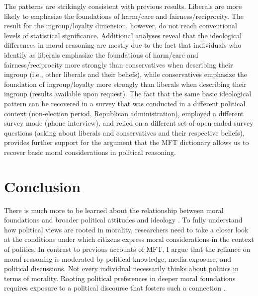 \documentclass[12pt]{article}
\begin{document}
The patterns are strikingly consistent with previous results. Liberals are more likely to emphasize the foundations of harm/care and fairness/reciprocity. The result for the ingroup/loyalty dimension, however, do not reach conventional levels of statistical significance. Additional analyses reveal that the ideological differences in moral reasoning are mostly due to the fact that individuals who identify as liberals emphasize the foundations of harm/care and fairness/reciprocity more strongly than conservatives when describing their ingroup (i.e., other liberals and their beliefs), while conservatives emphasize the foundation of ingroup/loyalty more strongly than liberals when describing their ingroup (results available upon request). The fact that the same basic ideological pattern can be recovered in a survey that was conducted in a different political context (non-election period, Republican administration), employed a different survey mode (phone interview), and relied on a different set of open-ended survey questions (asking about liberals and conservatives and their respective beliefs), provides further support for the argument that the MFT dictionary allows us to recover basic moral considerations in political reasoning.


\section*{Conclusion}

There is much more to be learned about the relationship between moral foundations and broader political attitudes and ideology \citep[e.g.,][]{feldman2013political}. To fully understand how political views are rooted in morality, researchers need to take a closer look at the conditions under which citizens express moral considerations in the context of politics. In contrast to previous accounts of MFT, I argue that the reliance on moral reasoning is moderated by political knowledge, media exposure, and political discussions. Not every individual necessarily thinks about politics in terms of morality. Rooting political preferences in deeper moral foundations requires exposure to a political discourse that fosters such a connection \citep[c.f.,][]{clifford2015concerns}.
\end{document}
